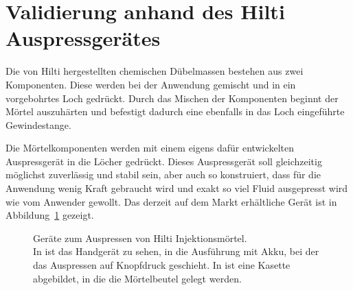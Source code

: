 \section{Validierung anhand des Hilti Auspressgerätes}
\label{Kapitel:Auspressgeraet}
Die von Hilti hergestellten chemischen Dübelmassen bestehen aus zwei Komponenten. Diese werden bei der Anwendung gemischt und in ein vorgebohrtes Loch gedrückt. Durch das Mischen der Komponenten beginnt der Mörtel auszuhärten und befestigt dadurch eine ebenfalls in das Loch eingeführte Gewindestange.

Die Mörtelkomponenten werden mit einem eigens dafür entwickelten Auspressgerät in die Löcher gedrückt. Dieses Auspressgerät soll gleichzeitig möglichst zuverlässig und stabil sein, aber auch so konstruiert, dass für die Anwendung wenig Kraft gebraucht wird und exakt so viel Fluid ausgepresst wird wie vom Anwender gewollt.
Das derzeit auf dem Markt erhältliche Gerät ist in Abbildung~\ref{fig:Auspressgeraet} gezeigt.
%
\begin{figure}[b]
    \centering
    \caption{Geräte zum Auspressen von Hilti Injektionsmörtel.\\In {} ist das Handgerät zu sehen, in  die Ausführung mit Akku, bei der das Auspressen auf Knopfdruck geschieht.
    In  ist eine Kasette abgebildet, in die die Mörtelbeutel gelegt werden.}
    \label{fig:Auspressgeraet}
\end{figure}
